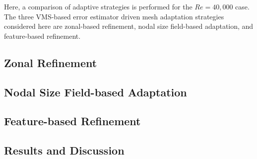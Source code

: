 Here, a comparison of adaptive strategies is performed for the $Re=40,000$ case.%
The three VMS-based error estimator driven mesh adaptation strategies considered here are zonal-based refinement, nodal size field-based adaptation, and feature-based refinement.

\subsection{Zonal Refinement}


\subsection{Nodal Size Field-based Adaptation}


\subsection{Feature-based Refinement}

\label{sec:feature_based_strat}


\subsection{Results and Discussion}

\label{sec:results_adapt}
